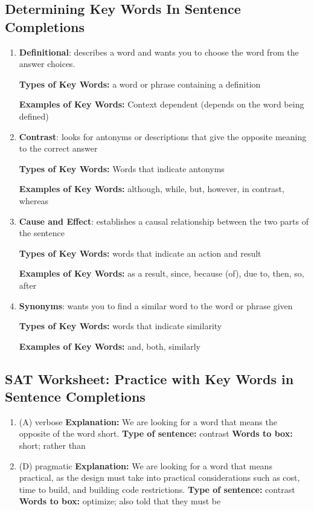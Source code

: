 \begin{enumerate}
\subsection{Determining Key Words In Sentence Completions}
\begin{enumerate}
\item \textbf{Definitional}: describes a word and wants you to choose the word from the answer choices. 

\textbf{Types of Key Words:} a word or phrase containing a definition 

\textbf{Examples of Key Words:} Context dependent (depends on the word being defined)

\item \textbf{Contrast}: looks for antonyms or descriptions that give the opposite meaning to the correct answer 

\textbf{Types of Key Words:} Words that indicate antonyms

\textbf{Examples of Key Words:} although, while, but, however, in contrast, whereas

\item \textbf{Cause and Effect}: establishes a causal relationship between the two parts of the sentence

\textbf{Types of Key Words:} words that indicate an action and result 

\textbf{Examples of Key Words:} as a result, since, because (of), due to, then, so, after

\item \textbf{Synonyms}: wants you to find a similar word to the word or phrase given

\textbf{Types of Key Words:} words that indicate similarity

\textbf{Examples of Key Words:} and, both, similarly

\end{enumerate}
\subsection{SAT Worksheet: Practice with Key Words in Sentence Completions}
\begin{enumerate}
\item (A) verbose
\textbf{Explanation:} We are looking for a word that means the opposite of the word short.
\textbf{Type of sentence:} contrast
\textbf{Words to box:} short; rather than

\item (D) pragmatic
\textbf{Explanation:} We are looking for a word that means practical, as the design must take into practical considerations such as cost, time to build, and building code restrictions.
\textbf{Type of sentence:} contrast
\textbf{Words to box:} optimize; also told that they must be


\end{enumerate}
\end{enumerate}
